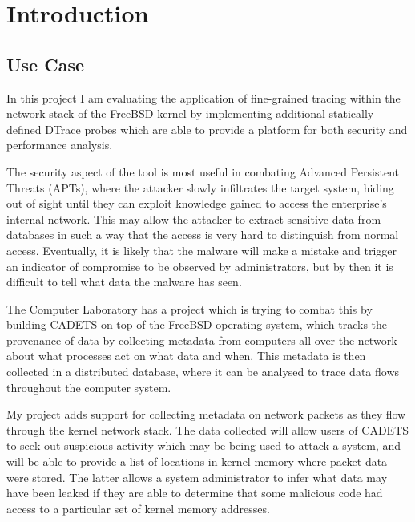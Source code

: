 \documentclass[a4paper,12pt,twoside,openright]{report}
\begin{document}
	\listoffigures
	
	
	\pagestyle{headings}
	
	\chapter{Introduction}
	
	\section{Use Case}
	
	In this project I am evaluating the application of fine-grained tracing within the network stack of the FreeBSD kernel by implementing additional statically defined DTrace probes which are able to provide a platform for both security and performance analysis.
	
	The security aspect of the tool is most useful in combating Advanced Persistent Threats (APTs)\cite{Tankard-APT}, where the attacker slowly infiltrates the target system, hiding out of sight until they can exploit knowledge gained to access the enterprise’s internal network. This may allow the attacker to extract sensitive data from databases in such a way that the access is very hard to distinguish from normal access. Eventually, it is likely that the malware will make a mistake and trigger an indicator of compromise to be observed by administrators, but by then it is difficult to tell what data the malware has seen.
	
	The Computer Laboratory has a project which is trying to combat this by building CADETS\cite{CADETS-main} on top of the FreeBSD operating system, which tracks the provenance of data by collecting metadata from computers all over the network about what processes act on what data and when. This metadata is then collected in a distributed database, where it can be analysed to trace data flows throughout the computer system.
	
	My project adds support for collecting metadata on network packets as they flow through the kernel	network stack. The data collected will allow users of CADETS to seek out suspicious activity which may be being used to attack a system, and will be able to provide a list of locations in kernel memory where packet data were stored. The latter allows a system administrator to infer what data may have been leaked if they are able to determine that some malicious code had access to a particular set of kernel memory addresses.
	
\end{document}
